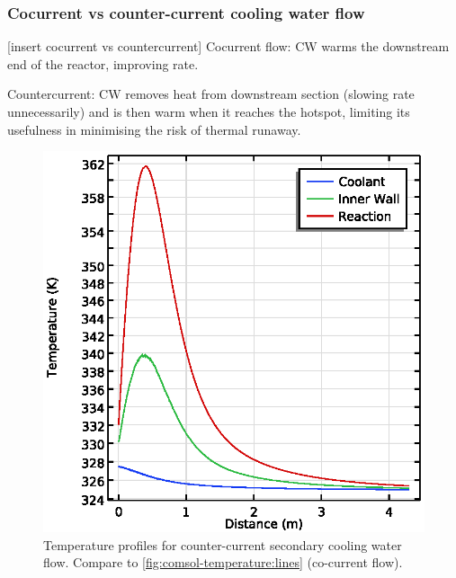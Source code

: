 \subsubsection{Cocurrent vs counter-current cooling water flow}
[insert cocurrent vs countercurrent]
Cocurrent flow: CW warms the downstream end of the reactor, improving rate.

Countercurrent: CW removes heat from downstream section (slowing rate unnecessarily) and is then warm when it reaches the hotspot, limiting its usefulness in minimising the risk of thermal runaway.

\begin{figure}[h]
    \centering
    \begin{minipage}{0.49\linewidth}
        \includegraphics[width=\linewidth]{figures/temperature-lines-countercurrent.eps}
        \caption{Temperature profiles for counter-current secondary cooling water flow. Compare to \cref{fig:comsol-temperature:lines} (co-current flow).}
        \label{fig:comsol-temperature:lines:countercurrent}
    \end{minipage}
    \begin{minipage}{0.49\linewidth}

\end{minipage}
\end{figure}
